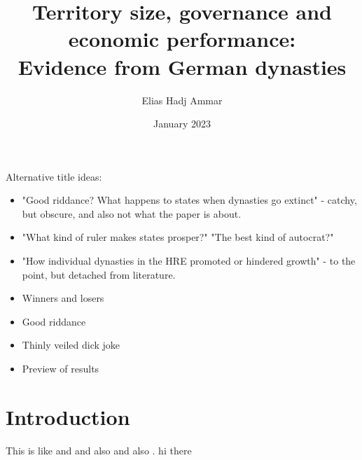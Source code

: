 \documentclass{article}
\title{Territory size, governance and economic performance: \\Evidence from German dynasties}
\author{Elias Hadj Ammar}
\date{January 2023}
\begin{document}
\maketitle
\thispagestyle{empty}

Alternative title ideas: 
\begin{itemize}
    \item "Good riddance? What happens to states when dynasties go extinct" - catchy, but obscure, and also not what the paper is about.
    \item "What kind of ruler makes states prosper?" "The best kind of autocrat?"
    \item "How individual dynasties in the HRE promoted or hindered growth" - to the point, but detached from literature.
    \item Winners and losers
    \item Good riddance
    \item Thinly veiled dick joke
    \item Preview of results
\end{itemize}

\newpage

\setcounter{page}{1}
 
\section{Introduction}

This is like \cite{as1997} and \cite{aw1998} and also \cite{as1997} and also \cite{olken2005}. hi there 

\newpage


\end{document}

